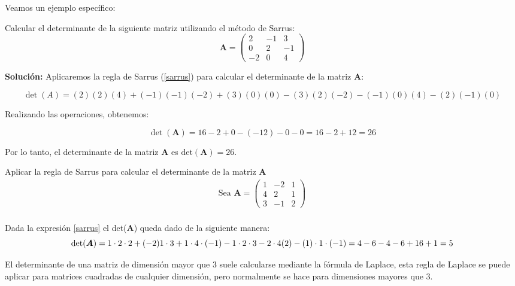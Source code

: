 Veamos un ejemplo específico:
\begin{example}
Calcular el determinante de la siguiente matriz utilizando el método de Sarrus:
\[ \boldsymbol{A} = \begin{pmatrix} 2 & -1 & 3 \\ 0 & 2 & -1 \\ -2 & 0 & 4 \end{pmatrix} \]

\textbf{Solución:}
Aplicaremos la regla de Sarrus (\ref{sarrus}) para calcular el determinante de la matriz \( \boldsymbol{A} \):

\[
\det(A) = (2)(2)(4) + (-1)(-1)(-2) + (3)(0)(0) - (3)(2)(-2) - (-1)(0)(4) - (2)(-1)(0)
\]

Realizando las operaciones, obtenemos:

\[
\det(\boldsymbol{A}) = 16 - 2 + 0 - (-12) - 0 - 0 = 16 -2  + 12 = 26
\]

Por lo tanto, el determinante de la matriz \( \boldsymbol{A} \) es \( \text{det}(\boldsymbol{A}) = 26 \).
\end{example}


\begin{exercise}
Aplicar la regla de Sarrus para calcular el determinante de la matriz $\boldsymbol{A}$
 $$\begin{aligned}
   \text{Sea} \,\,\boldsymbol{A}=\left(\begin{array}{ccc}
1 & -2 & 1 \\
4 & 2 & 1 \\
3 & -1 & 2
\end{array}\right)\\  
 \end{aligned}$$   
\end{exercise}

\begin{solution}
Dada la expresión \ref{sarrus} el det($\boldsymbol{A}$) queda dado de la siguiente manera:\\
\[\text{det}(\boldsymbol{A})=1 \cdot 2 \cdot 2+(-2) 1 \cdot 3+1 \cdot4 \cdot( -1)-1\cdot2\cdot3-2 \cdot 4(2)-(1) \cdot 1 \cdot(- 1)\\
 =4-6-4-6+16+1\\
 =5
 \]    
\end{solution}
    





El determinante de una matriz de dimensión mayor que 3 suele calcularse mediante la fórmula de Laplace, esta regla de Laplace  se puede aplicar para matrices cuadradas de cualquier dimensión, pero normalmente se hace para dimensiones mayores que 3.


